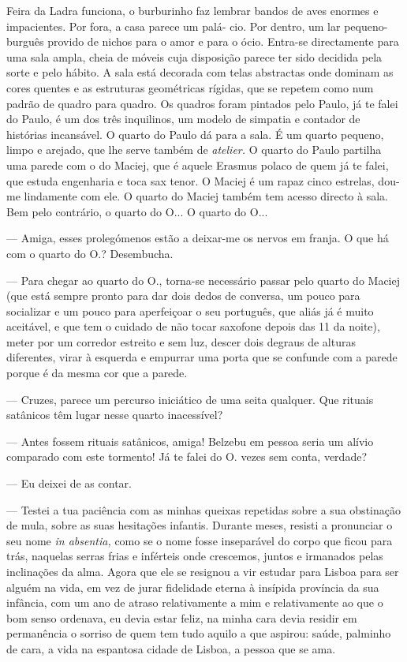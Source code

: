 Feira da Ladra funciona, o burburinho faz lembrar bandos de aves enormes
e impacientes. Por fora, a casa parece um palá- cio. Por dentro, um lar
pequeno-burguês provido de nichos para o amor e para o ócio. Entra-se
directamente para uma sala ampla, cheia de móveis cuja disposição parece
ter sido decidida pela sorte e pelo hábito. A sala está decorada com
telas abstractas onde dominam as cores quentes e as estruturas geométricas rígidas, que se repetem como num padrão de quadro para quadro.
Os quadros foram pintados pelo Paulo, já te falei do Paulo, é um dos
três inquilinos, um modelo de simpatia e contador de histórias
incansável. O quarto do Paulo dá para a sala. É um quarto pequeno, limpo
e arejado, que lhe serve também de \emph{atelier. }O quarto do Paulo
partilha uma parede com o do Maciej, que é aquele Erasmus polaco de quem
já te falei, que estuda engenharia e toca sax tenor. O Maciej é um rapaz
cinco estrelas, dou-me lindamente com ele. O quarto do Maciej também tem
acesso directo à sala. Bem pelo contrário, o quarto do O... O quarto do
O...

--- Amiga, esses prolegómenos estão a deixar-me os nervos em franja. O que
  há com o quarto do O.? Desembucha.

--- Para chegar ao quarto do O., torna-se necessário passar pelo quarto do
  Maciej (que está sempre pronto para dar dois dedos de conversa, um
  pouco para socializar e um pouco para aperfeiçoar o seu português, que
  aliás já é muito aceitável, e que tem o cuidado de não tocar saxofone
  depois das 11 da noite), meter por um corredor estreito e sem luz,
  descer dois degraus de alturas diferentes, virar à esquerda e empurrar
  uma porta que se confunde com a parede porque é da mesma cor que a
  parede.

--- Cruzes, parece um percurso iniciático de uma seita qualquer. Que
  rituais satânicos têm lugar nesse quarto inacessível?

--- Antes fossem rituais satânicos, amiga! Belzebu em pessoa seria um
  alívio comparado com este tormento! Já te falei do O. vezes sem conta,
  verdade?

--- Eu deixei de as contar.

--- Testei a tua paciência com as minhas queixas repetidas sobre a sua
  obstinação de mula, sobre as suas hesitações infantis. Durante meses,
  resisti a pronunciar o seu nome \emph{in absentia, }como se o nome
  fosse inseparável do corpo que ficou para trás, naquelas serras
  frias e inférteis onde crescemos, juntos e irmanados pelas inclinações
  da alma. Agora que ele se resignou a vir estudar para Lisboa para ser
  alguém na vida, em vez de jurar fidelidade eterna à insípida província
  da sua infância, com um ano de atraso relativamente a mim e relativamente ao que o bom senso ordenava, eu devia estar feliz, na minha
  cara devia residir em permanência o sorriso de quem tem tudo aquilo a
  que aspirou: saúde, palminho de cara, a vida na espantosa cidade de
  Lisboa, a pessoa que se ama.


